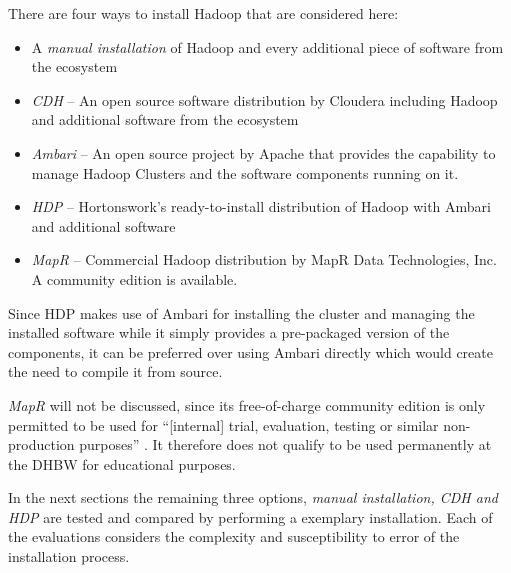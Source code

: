 There are four ways to install Hadoop that are considered here:

\begin{itemize}
    \item A \emph{manual installation} of Hadoop 
        and every additional piece of software from the ecosystem
    \item \emph{\acf{CDH}} --  An open source software distribution by Cloudera including Hadoop
        and additional software from the ecosystem
    \item \emph{Ambari} -- An open source project by Apache that provides
        the capability to manage Hadoop Clusters and the software components running on it.
    \item \emph{\acf{HDP}} -- Hortonswork's ready-to-install distribution of Hadoop 
        with Ambari and additional software
    \item \emph{MapR} -- Commercial Hadoop distribution by MapR Data Technologies, Inc. A community edition is available. 
        
\end{itemize}

Since \ac{HDP} makes use of Ambari for installing the cluster and managing the installed software \autocite[][]{hortonworks2018ambari} while it simply provides a pre-packaged version of the components, 
it can be preferred over using Ambari directly which would create the need to compile it from source.

\emph{MapR} will not be discussed, since its free-of-charge community edition is only permitted to be used for \enquote{[internal] trial, evaluation, testing or similar non-production purposes} \autocite[][para.~1.5]{mapr2018EULA}. 
It therefore does not qualify to be used permanently at the \ac{DHBW} for educational purposes.

In the next sections the remaining three options, 
\emph{manual installation, \ac{CDH} and \ac{HDP}}
are tested and compared by performing a exemplary installation.
Each of the evaluations considers the complexity and susceptibility to error of the installation process.


